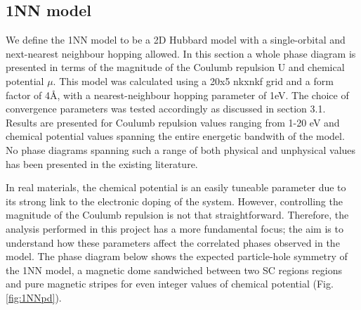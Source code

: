 \documentclass[12pt]{article}
\begin{document}
\subsection{1NN model}
\label{subsec:1NN model}

We define the 1NN model to be a 2D Hubbard model with a single-orbital and next-nearest neighbour hopping allowed. In this section a whole phase diagram is presented in terms of the magnitude of the Coulumb repulsion U and chemical potential $\mu$. This model was calculated using a 20x5 nkxnkf grid and a form factor
of 4\AA, with a  nearest-neighbour hopping parameter of 1eV.  The choice of convergence parameters was tested accordingly as discussed in section 3.1. Results are presented for Coulumb repulsion values  ranging from 1-20 eV and chemical potential values spanning the entire energetic bandwith of the model. No phase diagrams spanning such a range of both physical and unphysical values has been presented in the existing literature. 

\medskip

\noindent In real materials,  the chemical potential is an easily tuneable parameter due to its strong link to the electronic doping of the system. However, controlling the magnitude of the Coulumb repulsion is not that straightforward. Therefore, the analysis performed in this project has a more fundamental focus; the aim is to understand how these parameters affect the correlated phases observed in the model.
The phase diagram below shows the expected particle-hole symmetry of the  1NN model, a magnetic dome sandwiched between two SC regions regions and pure magnetic stripes for even integer values of chemical potential (Fig.\ref{fig:1NNpd}).\par
\end{document}
